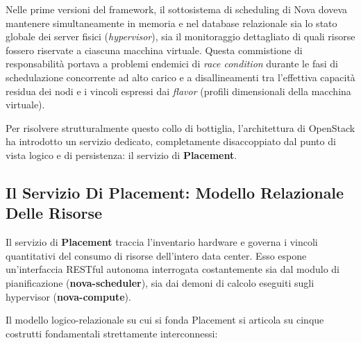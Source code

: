 \documentclass[11pt, a4paper]{article}
\begin{document}
Nelle prime versioni del framework, il sottosistema di scheduling di Nova doveva mantenere simultaneamente in memoria e nel database relazionale sia lo stato globale dei server fisici (\emph{hypervisor}), sia il monitoraggio dettagliato di quali risorse fossero riservate a ciascuna macchina virtuale. Questa commistione di responsabilità portava a problemi endemici di \emph{race condition} durante le fasi di schedulazione concorrente ad alto carico e a disallineamenti tra l'effettiva capacità residua dei nodi e i vincoli espressi dai \emph{flavor} (profili dimensionali della macchina virtuale).

Per risolvere strutturalmente questo collo di bottiglia, l'architettura di OpenStack ha introdotto un servizio dedicato, completamente disaccoppiato dal punto di vista logico e di persistenza: il servizio di \textbf{Placement}.

\subsection{Il Servizio Di Placement: Modello Relazionale Delle Risorse}

Il servizio di \textbf{Placement} traccia l'inventario hardware e governa i vincoli quantitativi del consumo di risorse dell'intero data center. Esso espone un'interfaccia RESTful autonoma interrogata costantemente sia dal modulo di pianificazione (\textbf{nova-scheduler}), sia dai demoni di calcolo eseguiti sugli hypervisor (\textbf{nova-compute}).


Il modello logico-relazionale su cui si fonda Placement si articola su cinque costrutti fondamentali strettamente interconnessi:
\end{document}
